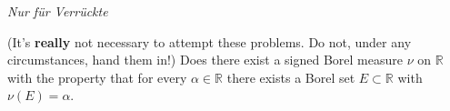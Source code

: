 \emph{Nur für Verrückte}

(It's \textbf{really} not necessary to attempt these problems. Do not, under any circumstances, hand them in!) Does there exist a signed Borel measure \(\nu\) on \(\mathbb{R}\) with the property that for every \(\alpha \in \mathbb{R}\) there exists a Borel set \(E \subset \mathbb{R}\) with \(\nu(E) = \alpha\).
